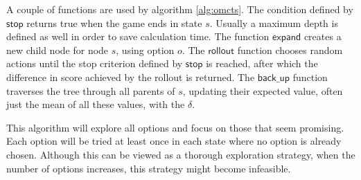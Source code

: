 A couple of functions are used by algorithm \ref{alg:omcts}. The condition defined by
$\mathsf{stop}$ returns true when the game ends in state $s$. Usually
a maximum depth is defined as well in order to save calculation time. The
function $\mathsf{expand}$ creates a new child node for node $s$, using option
$o$. The $\mathsf{rollout}$ function chooses random actions until the stop
criterion defined by $\mathsf{stop}$ is reached, after which the difference in
score achieved by the rollout is returned. The $\mathsf{back\_up}$ function
traverses the tree through all parents of $s$, updating their expected value,
often just the mean of all these values,  with the $\delta$. 

This algorithm will explore all options and focus on those that seem promising.
Each option will be tried at least once in each state where no option is already
chosen. Although this can be viewed as a thorough exploration strategy, when the
number of options increases, this strategy might become infeasible.
